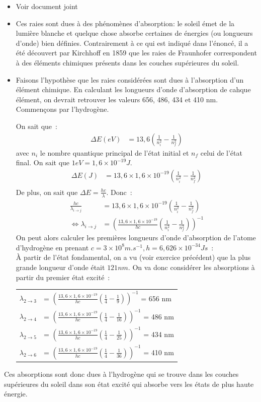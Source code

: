 \documentclass[12pt,french,dvips]{report}
\begin{document}
\begin{itemize}
		\item Voir document joint
		\item Ces raies sont dues à des phénomènes d'absorption: le soleil émet de la lumière blanche
			et quelque chose absorbe certaines de énergies (ou longueurs d'onde) bien définies.
			Contrairement à ce qui est indiqué dans l'énoncé, il a été découvert
			par Kirchhoff en 1859 que les raies de Fraunhofer correspondent à des éléments
			chimiques présents dans les couches supérieures du soleil.
		\item Faisons l'hypothèse que les raies considérées sont dues à l'absorption d'un élément
			chimique. En calculant les longueurs d'onde d'absorption de cahque élément,
			on devrait retrouver les valeurs 656, 486, 434 et 410 nm.
			Commençons par l'hydrogène.

			On sait que~:
			\begin{align}
				\Delta E (eV)&= 13,6 (\frac{1}{n_i^2} - \frac{1}{n_f^2})
			\end{align}
			avec $n_i$ le nombre quantique principal de l'état initial
			et $n_f$ celui de l'état final.
			On sait que $1eV = 1,6\times10^{-19}J$.
			\begin{align}
				\Delta E (J) &= 13,6\times1,6\times10^{-19} \left(\frac{1}{n_i^2} - \frac{1}{n_f^2}\right)\\
			\end{align}
			De plus, on sait que $\Delta E=\frac{hc}{\lambda}$. Donc~:
			\begin{align}
				\frac{hc}{\lambda_{i\rightarrow j}} &= 13,6\times1,6\times10^{-19} \left(\frac{1}{n_i^2} - \frac{1}{n_f^2}\right)\\
				\Leftrightarrow\lambda_{i\rightarrow j} &= \left(\frac{13,6\times 1,6\times 10^{-19}}{hc}\left(\frac{1}{n_i^2} - \frac{1}{n_f^2}\right)\right)^{-1}
			\end{align}
			On peut alors calculer les premières longueurs d'onde d'absorption de l'atome
			d'hydrogène en prenant $c=3\times 10^8 m.s^{-1}, h=6,626\times 10^{-34}Js$~:\\
			À partir de l'état fondamental, on a vu (voir exercice précédent) que la plus grande longueur d'onde était $121 nm$. On va donc considérer les absorptions à partir du premier état excité~:
			\begin{tabular}{ll}
				$\lambda_{2\rightarrow 3}$ & = $\left(\frac{13,6\times 1,6\times 10^{-19}}{hc}\left(\frac{1}{4} - \frac{1}{9}\right)\right)^{-1}$ = 656 nm \\
				$\lambda_{2\rightarrow 4}$ & = $\left(\frac{13,6\times 1,6\times 10^{-19}}{hc}\left(\frac{1}{4} - \frac{1}{16}\right)\right)^{-1}$ = 486 nm \\
				$\lambda_{2\rightarrow 5}$ & = $\left(\frac{13,6\times 1,6\times 10^{-19}}{hc}\left(\frac{1}{4} - \frac{1}{25}\right)\right)^{-1}$ = 434 nm \\
				$\lambda_{2\rightarrow 6}$ & = $\left(\frac{13,6\times 1,6\times 10^{-19}}{hc}\left(\frac{1}{4} - \frac{1}{36}\right)\right)^{-1}$ = 410 nm \\
			\end{tabular}
\end{itemize}
Ces absorptions sont donc dues à l'hydrogène qui se trouve dans les couches supérieures du soleil dans son état excité qui absorbe vers les états de plus haute énergie.
\end{document}

